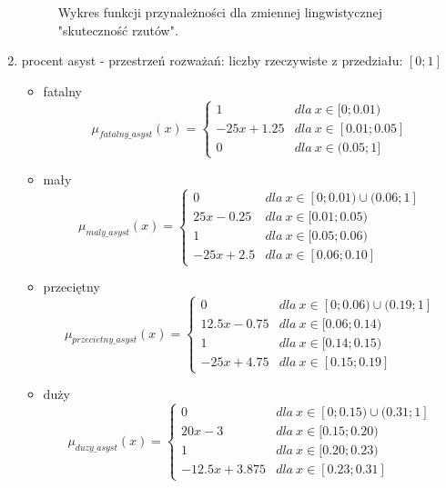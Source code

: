 \documentclass{classrep}
\begin{document}
\begin{enumerate}
\begin{figure}[H]
        \caption{Wykres funkcji przynależności dla zmiennej lingwistycznej "skuteczność rzutów".}
        \label{rysunek:skutecznosc}
    \end{figure}
    \item procent asyst - przestrzeń rozważań: liczby rzeczywiste z przedziału: $[0;1]$
    \begin{itemize}
        \item fatalny
        \begin{equation}
            \mu_{fatalny\_asyst}(x) = \left\{\begin{matrix} 1 & dla \: x\in[0;0.01) \\ -25x + 1.25 & dla \: x\in [0.01; 0.05] \\ 0 & dla \: x\in (0.05;1] \end{matrix}\right.
        \end{equation}
        \item mały
        \begin{equation}
            \mu_{maly\_asyst}(x) = \left\{\begin{matrix} 0 & dla \: x\in [0;0.01) \cup (0.06;1] \\ 25x-0.25 & dla \: x\in[0.01;0.05) \\ 1 & dla \: x\in [0.05; 0.06) \\ -25x + 2.5 & dla \: x\in[0.06;0.10] \end{matrix}\right.
        \end{equation}
        \item przeciętny
        \begin{equation}
            \mu_{przecietny\_asyst}(x) = \left\{\begin{matrix} 0 & dla \: x\in [0;0.06) \cup (0.19;1] \\ 12.5x - 0.75 & dla \: x\in[0.06;0.14) \\ 1 & dla \: x\in [0.14; 0.15) \\ -25x + 4.75 & dla \: x\in[0.15;0.19] \end{matrix}\right.
        \end{equation}
        \item duży
        \begin{equation}
            \mu_{duzy\_asyst}(x) = \left\{\begin{matrix} 0 & dla \: x\in [0;0.15) \cup (0.31;1] \\ 20x - 3 & dla \: x\in[0.15;0.20) \\ 1 & dla \: x\in [0.20; 0.23) \\ -12.5x + 3.875 & dla \: x\in[0.23;0.31] \end{matrix}\right.

\end{equation}
\end{itemize}
\end{enumerate}
\end{document}
